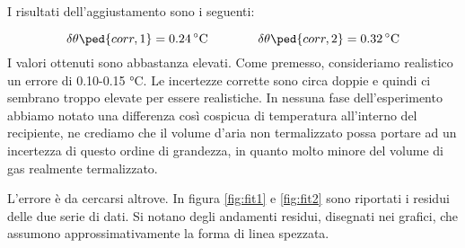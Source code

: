 I risultati dell'aggiustamento sono i seguenti:

\begin{equation}
    \delta \theta\ped{corr,1} = \SI{0.24}{\celsius} \qquad \qquad \delta \theta\ped{corr,2} = \SI{0.32}{\celsius}
\end{equation}
%
I valori ottenuti sono abbastanza elevati. Come premesso, consideriamo realistico un errore di 0.10-0.15 \si{\celsius}.
Le incertezze corrette sono circa doppie e quindi ci sembrano troppo elevate per essere realistiche. In nessuna fase
dell'esperimento abbiamo notato una differenza così cospicua di temperatura all'interno del recipiente, ne crediamo che
il volume d'aria non termalizzato possa portare ad un incertezza di questo ordine di grandezza, in quanto molto minore
del volume di gas realmente termalizzato.

L'errore è da cercarsi altrove. In figura \ref{fig:fit1} e \ref{fig:fit2} sono riportati i residui delle due
serie di dati. Si notano degli andamenti residui, disegnati nei grafici, che assumono approssimativamente la forma di linea spezzata.
